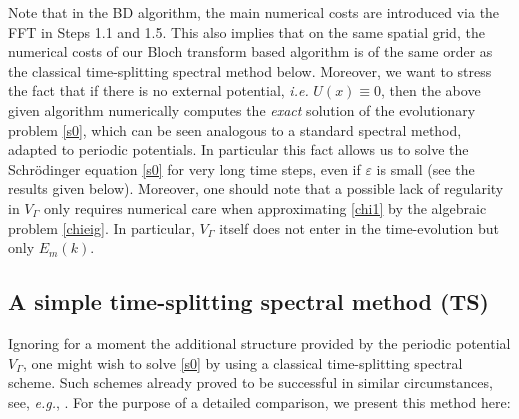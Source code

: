 \documentclass[leqno,final]{siamltex}
\numberwithin{equation}{section}
\newcounter{me}
\begin{document}
Note that in the BD algorithm, the main numerical costs are
introduced via the FFT in Steps 1.1 and 1.5. This also implies
that on the same spatial grid, the numerical costs of our Bloch
transform based algorithm is of the same order as the classical
time-splitting spectral method below. Moreover, we want to stress
the fact that if there is no external potential, {{\sl i.e.\/ }} $U(x)\equiv
0$, then the above given algorithm numerically computes the
\emph{exact} solution of the evolutionary problem \eqref{s0},
which can be seen analogous to a standard spectral method, adapted
to periodic potentials. In particular this fact allows us to solve
the Schr\"odinger equation \eqref{s0} for very long time steps,
even if ${{\varepsilon }}$ is small (see the results given below). Moreover, one
should note that a possible lack of regularity in $V_\Gamma$ only
requires numerical care when approximating \eqref{chi1} by the
algebraic problem \eqref{chieig}. In particular, $V_\Gamma$ itself
does not enter in the time-evolution but only $E_m(k)$.

\subsection{A simple time-splitting spectral method (TS)}\label{tsm}
Ignoring for a moment the additional structure provided by the
periodic potential $V_\Gamma$, one might wish to solve \eqref{s0}
by using a classical time-splitting spectral scheme. Such schemes
already proved to be successful in similar circumstances, see,
{{\sl e.g.\/}}, \cite{BJM, BJM1, GoMa, HJMSZ}. For the purpose of a detailed
comparison, we present this method here:
\end{document}
